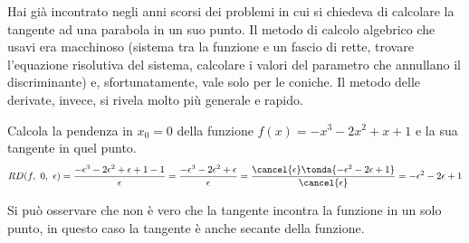 Hai già incontrato negli anni scorsi dei problemi in cui si chiedeva di 
calcolare la tangente ad una parabola in un suo punto. 
Il metodo di calcolo algebrico che usavi era macchinoso (sistema tra la 
funzione e un fascio di rette, trovare l'equazione risolutiva del sistema, 
calcolare i valori del parametro che annullano il discriminante) e, 
sfortunatamente, vale solo per le coniche. 
Il metodo delle derivate, invece, si rivela molto più generale e rapido.

% 

\begin{esempio}
Calcola la pendenza in \(x_0 = 0\) della funzione 
\(f(x)=-x^3 -2x^2 +x +1\) e la sua tangente in quel punto.
\[
RD(f,~0,~\epsilon) = 
   \frac{-\epsilon^3 -2\epsilon^2 +\epsilon +1 -1}{\epsilon} =
   \frac{-\epsilon^3 -2\epsilon^2 +\epsilon} {\epsilon} =
   \frac{\cancel{\epsilon} \tonda{-\epsilon^2 -2\epsilon +1}} 
        {\cancel{\epsilon}} = -\epsilon^2 -2\epsilon +1
\]

\osservazione
Si può osservare che non è vero che la tangente incontra la funzione in un solo 
punto, in questo caso la tangente è anche secante della funzione.
\end{esempio}

